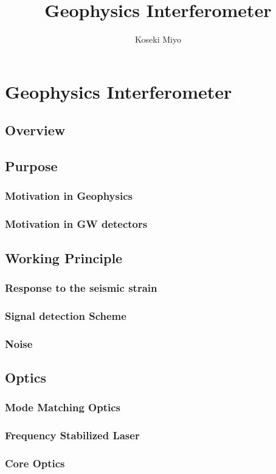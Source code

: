 \documentclass[a4paper,12pt]{book}
\title{Geophysics Interferometer}
\author{Koseki Miyo}
\begin{document}
\setcounter{tocdepth}{2}
\maketitle

\tableofcontents
\chapter{Geophysics Interferometer}
\section{Overview}
\section{Purpose}
\subsection{Motivation in Geophysics}
\subsection{Motivation in GW detectors}
\section{Working Principle}
\subsection{Response to the seismic strain}
\subsection{Signal detection Scheme}
\subsection{Noise}
\section{Optics}
\subsection{Mode Matching Optics}
\subsection{Frequency Stabilized Laser}
\subsection{Core Optics}
\end{document}
